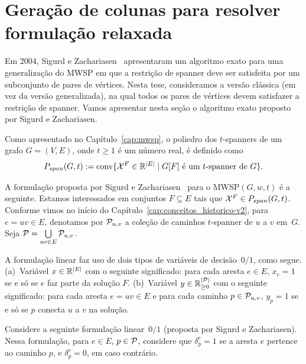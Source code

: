 \section{Geração de colunas para resolver formulação relaxada}
\label{sec:mwsp_cg}
Em 2004, Sigurd e Zachariasen~\cite{SigurdZ2004} apresentaram um
algoritmo exato para uma generalização do MWSP em que a restrição de
spanner deve ser satisfeita por um subconjunto de pares de
vértices. Nesta tese, consideramos a versão clássica (em vez da versão
generalizada), na qual todos os pares de vértices devem satisfazer a
restrição de spanner.
Vamos apresentar nesta seção o algoritmo exato proposto por
Sigurd e Zachariasen.


Como apresentado no Capítulo~\ref{cap:mwsp}, o poliedro dos
$t$-spanners de um grafo $G=(V,E)$, onde $t\ge 1$ é um número real, é
definido como
\begin{equation*}
\begin{split}
P_{span}(G,t) := \text{conv}\{\mathcal{X}^{F} \in \mathbb{R}^{|E|}\; |\;
\text{$G[F]$ é um $t$-spanner de $G$\}}. 
\end{split}
\end{equation*}

A formulação proposta por Sigurd e Zachariasen~\cite{SigurdZ2004} para
o MWSP$(G,w,t)$ é a seguinte. Estamos interessados em conjuntos $F\subseteq E$
tais que $\mathcal{X}^{F} \in P_{span}(G,t)$.  Conforme vimos no início do
Capítulo~\ref{cap:conceitos_historico-v2}, para $e=uv \in E$, denotamos por
$\mathcal{P}_{u,v}$ a coleção de caminhos $t$-spanner de $u$ a $v$ em~$G$. Seja
$\mathcal{P} = \bigcup\limits_{uv \in E} \mathcal{P}_{u,v}$.  

A formulação linear faz uso de dois tipos de variáveis de
decisão~$0/1$, como segue.  (a)~Variável $x \in \mathbb{R}^{|E|}$ com o seguinte
significado: para cada aresta $e \in E$, $x_e = 1$ se e só se $e$
faz parte da solução $F$. (b)~Variável $y \in \mathbb{R}^{|\mathcal{P}|}_{\ge 0}$ com o
seguinte significado: para cada aresta $e=uv \in E$ e para cada
caminho $p \in \mathcal{P}_{u,v}$, $y_p = 1$ se e só se $p$ conecta $u$ a $v$ na
solução.

Considere a seguinte formulação linear~$0/1$ (proposta por Sigurd e
Zachariasen). Nessa formulação, para $e \in E$, $p \in \mathcal{P}$,
considere que $\delta^e_p = 1$ se a aresta $e$ pertence ao caminho
$p$, e $\delta^e_p = 0$, em caso contrário. 
%
\begin{lpformulation}[\FullPrimalPL]
\end{lpformulation}

